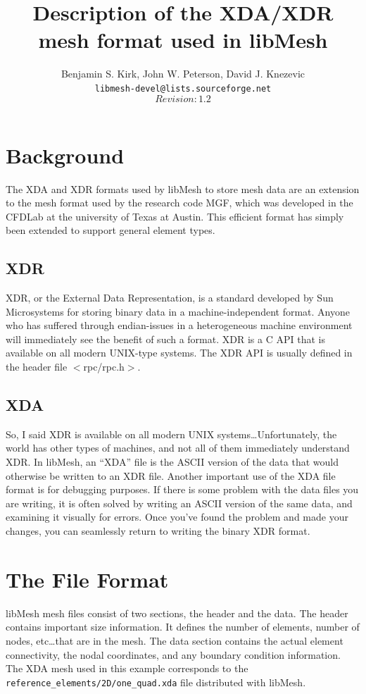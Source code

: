 \documentclass[12pt]{article}
\begin{document}
  
\title{Description of the XDA/XDR mesh format used in libMesh}
\author{Benjamin S. Kirk, John W. Peterson, David J. Knezevic \\
        \texttt{libmesh-devel@lists.sourceforge.net} \\
	$$Revision: 1.2 $$} 
\maketitle

\section{Background}
The XDA and XDR formats used by libMesh to store mesh data are an extension to the mesh format used by the research code MGF, which was developed in the CFDLab at the university of Texas at Austin.  This efficient format has simply been extended to support general element types.

\subsection{XDR}
XDR, or the External Data Representation, is a standard developed by Sun Microsystems for storing binary data in a machine-independent format.  Anyone who has suffered through endian-issues in a heterogeneous machine environment will immediately see the benefit of such a format.  XDR is a C API that is available on all modern UNIX-type systems.  The XDR API is usually defined in the header file $<$rpc/rpc.h$>$.

\subsection{XDA}
So, I said XDR is available on all modern UNIX systems\ldots Unfortunately, the world has other types of machines, and not all of them immediately understand XDR.  In libMesh, an ``XDA'' file is the ASCII version of the data that would otherwise be written to an XDR file.  Another important use of the XDA file format is for debugging purposes.  If there is some problem with the data files you are writing, it is often solved by writing an ASCII version of the same data, and examining it visually for errors.  Once you've found the problem and made your changes, you can seamlessly return to writing the binary XDR format.

\section{The File Format}
libMesh mesh files consist of two sections, the header and the data.  The header contains important size information.  It defines the number of elements, number of nodes, etc\ldots that are in the mesh.  The data section contains the actual element connectivity, the nodal coordinates, and any boundary condition information.  The XDA mesh used in this example corresponds to the \texttt{reference\_elements/2D/one\_quad.xda} file distributed with libMesh.
\end{document}
